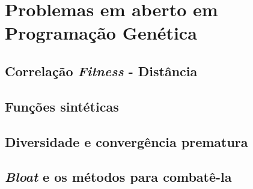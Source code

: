 \section{Problemas em aberto em Programação Genética}
\label{sec:2problemas}

\subsection{Correlação \emph{Fitness} - Distância}
\subsection{Funções sintéticas}
\subsection{Diversidade e convergência prematura}
\subsection{\emph{Bloat} e os métodos para combatê-la}